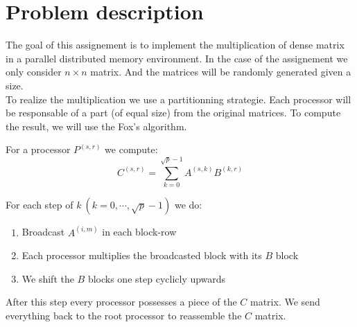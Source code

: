 \chapter{Problem description}

The goal of this assignement is to implement the multiplication of dense matrix in a parallel distributed memory environment. In the case of the assignement we only consider $n\times n$ matrix. And the matrices will be randomly generated given a size.\\

To realize the multiplication we use a partitionning strategie. Each processor will be responsable of a part (of equal size) from the original matrices. To compute the result, we will use the Fox's algorithm.

For a processor $P^{(s,r)}$ we compute:
\[C^{(s,r)} = \sum^{\sqrt{p}-1}_{k=0}A^{(s,k)}B^{(k,r)}\]

For each step of $k\ (k=0,\cdots,\sqrt{p}-1)$ we do:
\begin{enumerate}[1. ]
  \item Broadcast $A^{(i,m)}$ in each block-row
  \item Each processor multiplies the broadcasted block with its $B$ block
  \item We shift the $B$ blocks one step cyclicly upwards
\end{enumerate}

After this step every processor possesses a piece of the $C$ matrix. We send everything back to the root processor to reassemble the $C$ matrix.
